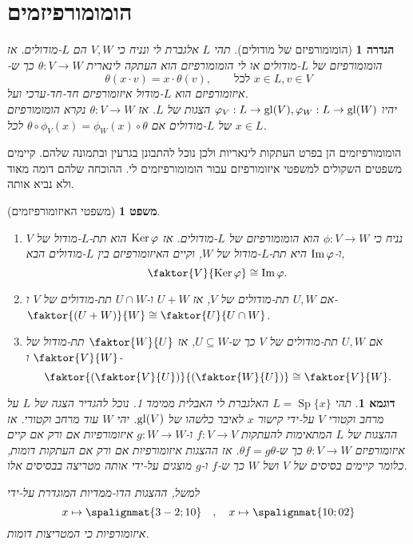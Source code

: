 \documentclass{report}
\theoremstyle{break}
\newtheorem{theorem}{משפט}[chapter]
\newtheorem{definition}[definition]{הגדרה}
\newtheorem{example}[example]{דוגמא}
\theoremstyle{MyNonumberbreak}
\DeclareMathOperator{\Sp}{Sp}
\begin{document}
\section{הומומורפיזמים}
\begin{definition}[הומומורפיזם של מודולים]
	תהי $L$ אלגברת לי ונניח כי $V, W$ הם $L$-מודולים. אז \textit{הומומורפיזם של $L$-מודולים} או \textit{לי הומומורפיזם} הוא העתקה לינארית $\theta : V \to W$ כך ש-
	\[ \theta(x \cdot v) = x \cdot \theta(v), \qquad \text{לכל $x \in L, v \in V$} \]
	איזומורפיזם הוא $L$-מודול איזומורפיזם חד-חד-ערכי ועל. \\	
	יהיו $\varphi_V : L \to \operatorname{gl}(V), \varphi_W : L \to \operatorname{gl}(W)$ הצגות של $L$. אז $\theta : V \to W$ נקרא \textit{הומומורפיזם של $L$-מודולים} אם $\theta \circ \phi_V(x) = \phi_W(x) \circ \theta$ לכל $x \in L$.
\end{definition}
הומומורפיזמים הן בפרט העתקות לינאריות ולכן נוכל להתבונן בגרעין ובתמונה שלהם. קיימים משפטים השקולים למשפטי איזומורפיזם עבור הומומורפיזמים לי. ההוכחה שלהם דומה מאוד ולא נביא אותה.
\begin{theorem}[משפטי האיזומורפיזמים]
	\begin{enumerate}[label=(\alph*)]
		\item 
		נניח כי $\phi : V \to W$ הוא הומומורפיזם של $L$-מודולים. אז $\operatorname{Ker}\varphi$ הוא תת-$L$-מודול של $V$ ו-$\operatorname{Im}\varphi$ היא תת-$L$-מודול של $W$, וקיים האיזומורפיזם בין $L$-מודולים הבא,
		\[ \faktor{V}{\Ker\phi} \cong \Img\phi. \]
		\item
		אם $U, W$ תת-מודולים של $V$, אז $U + W$ ו-$U \cap W$ תת-מודולים של $V$ ו-$\faktor{(U + W)}{W} \cong \faktor{U}{U \cap W}$.
		\item
		אם $U, W$ תת-מודולים של $V$ כך ש-$U \subseteq W$, אז $\faktor{W}{U}$ תת-מודול של $\faktor{V}{W}$ ו-
		\[ \faktor{(\faktor{V}{U})}{(\faktor{W}{U})} \cong \faktor{V}{W}. \]
	\end{enumerate}
\end{theorem}
\begin{example}
	תהי $L = \Sp\{x\}$ האלגברת לי האבלית ממימד 1. נוכל להגדיר הצגה של $L$ על מרחב וקטורי $V$ על-ידי קישור $x$ לאיבר כלשהו של $\operatorname{gl}(V)$. יהי $W$ עוד מרחב וקטורי. אז ההצגות של $L$ המתאימות להעתקות $f : V \to V$ ו-$g : W \to W$ איזומורפיות אם ורק אם קיים איזומורפיזם $\theta : V \to W$ כך ש-$\theta f = g\theta$. אז ההצגות איזומורפיות אם ורק אם העתקות דומות, כלומר קיימים בסיסים של $V$ ושל $W$ כך ש-$f$ ו-$g$ מוצגים על-ידי אותה מטריצה בבסיסים אלו.
	
	למשל, ההצגות הדו-ממדיות המוגדרת על-ידי
	\[ x \mapsto \spalignmat{3 -2 ; 1 0} \quad , \quad x \mapsto \spalignmat{1 0 ; 0 2} \]
	איזומורפיות כי המטריצות דומות.
\end{example}
\end{document}
